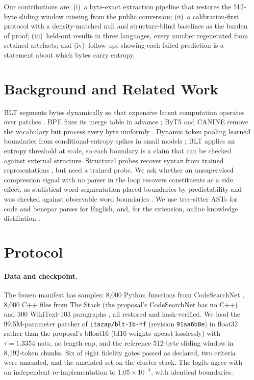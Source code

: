 Our contributions are: (i)~a byte-exact extraction pipeline that restores the 512-byte sliding window missing from the public conversion; (ii)~a calibration-first protocol with a density-matched null and structure-blind baselines as the burden of proof; (iii)~held-out results in three languages, every number regenerated from retained artefacts; and (iv)~follow-ups showing each failed prediction is a statement about which bytes carry entropy.

\section{Background and Related Work}
BLT segments bytes dynamically so that expensive latent computation operates over patches \citep{pagnoni-etal-2025-byte}. BPE fixes its merge table in advance \citep{sennrich-etal-2016-neural}; ByT5 and CANINE remove the vocabulary but process every byte uniformly \citep{xue-etal-2022-byt5,clark-etal-2022-canine}. Dynamic token pooling learned boundaries from conditional-entropy spikes in small models \citep{nawrot-etal-2023-efficient}; BLT applies an entropy threshold at scale, so each boundary is a claim that can be checked against external structure. Structural probes recover syntax from trained representations \citep{hewitt-manning-2019-structural,feng-etal-2020-codebert}, but need a trained probe. We ask whether an unsupervised compression signal with no parser in the loop recovers constituents as a side effect, as statistical word segmentation placed boundaries by predictability and was checked against observable word boundaries \citep{brent1999segmentation,goldwater2009word}. We use tree-sitter ASTs for code and benepar parses \citep{kitaev-klein-2018-constituency} for English, and, for the extension, online knowledge distillation \citep{hinton2015distilling}.

\section{Protocol}
\label{sec:protocol}
\paragraph{Data and checkpoint.} The frozen manifest has \nSamples{} samples: 8{,}000 Python functions from CodeSearchNet \citep{husain2019codesearchnet}, 8{,}000 C++ files from The Stack \citep{kocetkov2022stack} (the proposal's CodeSearchNet has no C++) and 300 WikiText-103 paragraphs \citep{merity2017pointer}, all restored and hash-verified. We load the 99.5M-parameter patcher of \texttt{itazap/blt-1b-hf} (revision \texttt{91aa6b8e}) in float32 rather than the proposal's bfloat16 (bf16 weights upcast losslessly) with $\tau=1.3354$ nats, no length cap, and the reference 512-byte sliding window in 8{,}192-token chunks. Six of eight fidelity gates passed as declared, two criteria were amended, and the amended set \FidelityAda{} on the cluster stack. The logits agree with an independent re-implementation to $1.05\times10^{-4}$, with identical boundaries.

